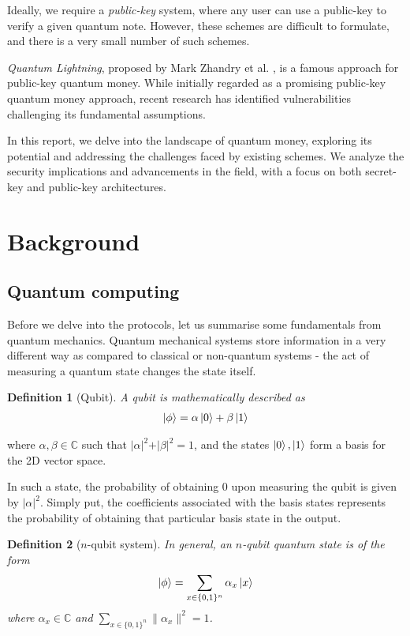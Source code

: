 \documentclass[]{article}
\newtheorem{definition}{Definition}
\newcommand{\C}{\mathbb C}
\begin{document}
Ideally, we require a \textit{public-key} system, where any user can use a public-key to verify a given quantum note. However, these schemes are difficult to formulate, and there is a very small number of such schemes. 


\textit{Quantum Lightning}, proposed by Mark Zhandry et al. \cite{quantum_lightning}, is a famous approach for public-key quantum money. While initially regarded as a promising public-key quantum money approach, recent research \cite{quantum_lightning_security} has identified vulnerabilities challenging its fundamental assumptions.


In this report, we delve into the landscape of quantum money, exploring its potential and addressing the challenges faced by existing schemes. We analyze the security implications and advancements in the field, with a focus on both secret-key and public-key architectures.

\section{Background}

\subsection{Quantum computing}
Before we delve into the protocols, let us summarise some fundamentals from quantum mechanics. Quantum mechanical systems store information in a very different way as compared to classical or non-quantum systems - the act of measuring a quantum state changes the state itself. 

\begin{definition}[Qubit]
A qubit is mathematically described as 
\begin{align*}
    \ket{\phi} = \alpha \ket{0} + \beta \ket{1} 
\end{align*}
\end{definition}

where $\alpha, \beta \in \mathbb{C}$ such that $\vert \alpha \vert^2 + \vert \beta \vert^2 = 1$, and the states $\ket{0}, \ket{1}$ form a basis for the 2D vector space.

In such a state, the probability of obtaining $0$ upon measuring the qubit is given by $\vert \alpha \vert^2$. Simply put, the coefficients associated with the basis states represents the probability of obtaining that particular basis state in the output.

\begin{definition}[$n$-qubit system]
    In general, an $n$-qubit quantum state is of the form
    \begin{align}
        \ket{\phi} = \sum_{x \in \{0, 1\}^n} \alpha_x \ket{x}
    \end{align}
    where $\alpha_x \in  \C$ and $\sum_{x \in \{0, 1\}^n} \|\alpha_x\|^2  = 1$.
\end{definition}
\end{document}

